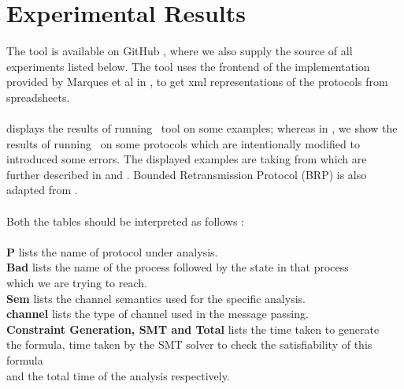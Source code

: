 \section{Experimental Results}



The tool is available on GitHub \cite{github.MPass}, where we also
supply the source of all experiments listed below.
%
The tool uses the frontend of the implementation provided by Marques et al in 
\cite{CSV2UPPAAL}, to get {\sc xml} representations of the protocols from
spreadsheets.
\\\\
 displays the results of running \MPass\ tool on 
some examples;  whereas in , we show the 
results of running \MPass\ on some protocols which are intentionally modified to 
 introduced some errors. The displayed  examples are   taking  from \cite{JRSVgit} 
which are further described in \cite{MPSV11} and \cite{RSV11}.
Bounded Retransmission Protocol (BRP) is also adapted from \cite{AABJ04}.
\\\\
Both the tables should be interpreted as follows :\\
\\\hspace*{5mm}{\bf Column} {\bf P} lists the name of protocol under analysis.
\\\hspace*{5mm}{\bf Column} {\bf Bad} lists the name of the process followed by the state in that process
\\\hspace*{5mm}which we are trying to reach.
\\\hspace*{5mm}{\bf Column} {\bf Sem} lists the channel semantics used for the specific analysis.
\\\hspace*{5mm}{\bf Column} {\bf channel} lists the type of channel used in the message passing.
\\\hspace*{5mm}{\bf Column} {\bf Constraint Generation, SMT  and Total} lists the time taken to generate
\\\hspace*{5mm} the formula, time taken by the SMT solver to check the satisfiability of this formula \\\hspace*{5mm}and the total time of the analysis respectively.
